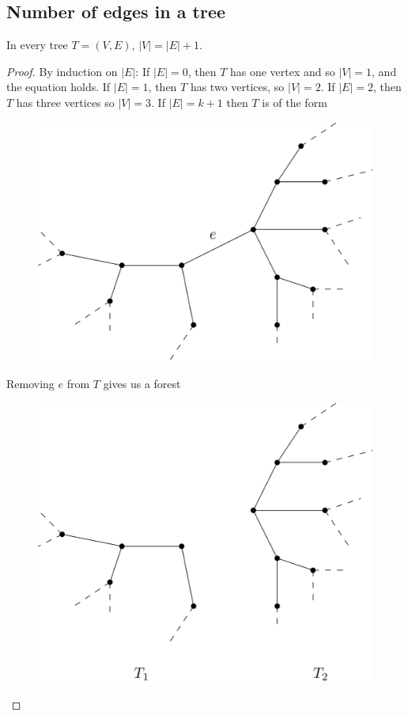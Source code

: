 \documentclass[11pt]{article}
\begin{document}
    \pagebreak
    
    \subsection{Number of edges in a tree}

    In every tree \(T = (V,E)\), \(|V| = |E| + 1\).
    \begin{proof}
        By induction on \(|E|\): If \(|E| = 0\), then $T$ has one vertex and so \(|V| = 1\), and the equation holds. If \(|E| = 1\), then $T$ has two vertices, so \(|V| = 2\). If \(|E| = 2\), then $T$ has three vertices so \(|V| = 3\). If \(|E| = k+1\) then $T$ is of the form
        \begin{figure}[H]
            \centering
            \includegraphics[scale=0.1]{e.png}
        \end{figure}
        Removing $e$ from $T$ gives us a forest 
        \begin{figure}[H]
            \centering
            \includegraphics[scale=0.1]{forest.png}

\end{figure}
\end{proof}
\end{document}
